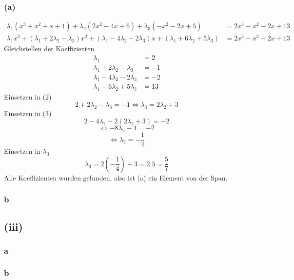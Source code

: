 \documentclass{article}
\begin{document}
\subsubsection*{(a)}
\begin{align*}
    \lambda_1 (x^3 + x^2 + x + 1) + \lambda_2 (2x^2 - 4x + 6) + \lambda_3 (-x^2 - 2x + 5) &= 2x^3 - x^2 - 2x + 13 \\
    \lambda_1 x^3 + (\lambda_1 + 2 \lambda_2 - \lambda_3)x^2 + (\lambda_1 - 4 \lambda_2 - 2 \lambda_3)x + (\lambda_1 + 6 \lambda_2 + 5 \lambda_3) &= 2x^3 - x^2 - 2x + 13
\end{align*}
Gleichstellen der Koeffizienten
\begin{align}
    \lambda_1 &= 2 \\
    \lambda_1 + 2 \lambda_2 - \lambda_3 &= -1 \\
    \lambda_1 - 4\lambda_2 - 2\lambda_3 &= -2 \\
    \lambda_1 - 6\lambda_2 + 5\lambda_3 &= 13 
\end{align}
Einsetzen in (2)
\[2 + 2 \lambda_2 - \lambda_3 = -1 \Leftrightarrow \lambda_3 = 2 \lambda_2 + 3\]
Einsetzen in (3)
\[2 - 4 \lambda_2 - 2 (2 \lambda_2 + 3) = -2\]
\[\Leftrightarrow -8 \lambda_2 - 4 = - 2\]
\[\Leftrightarrow \lambda_2 = - \frac{1}{4}\]
Einsetzen in $\lambda_3$
\[\lambda_3 = 2 (- \frac{1}{4}) + 3 = 2.5 = \frac{5}{7}\]
Alle Koeffizienten wurden gefunden, also ist (a) ein Element von der Span.

\subsubsection*{b}

\subsection*{(iii)}
\subsubsection*{a}
\subsubsection*{b}
\end{document}
